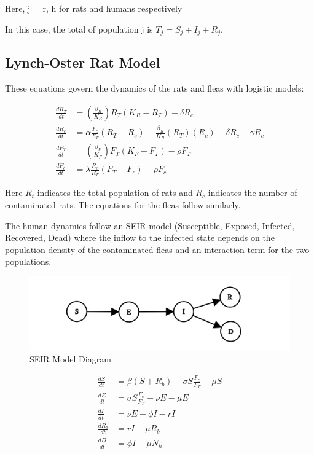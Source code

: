 \documentclass [letterpaper, 12pt] {article}
\begin{document}
Here, j = r, h for rats and humans respectively

In this case, the total of population j is $T_j = S_j + I_j + R_j$.

\newpage
\subsection{Lynch-Oster Rat Model}

These equations govern the dynamics of the rats and fleas with logistic models:

\begin{align}
	\frac{dR_T}{dt} & = (\frac{\beta_R}{K_R})R_T(K_R-R_T)-\delta R_c                                             \\
	\frac{dR_c}{dt} & = \alpha \frac{F_c}{F_T} (R_T-R_c)-\frac{\beta_R}{K_R}(R_T)(R_c) - \delta R_c - \gamma R_c \\
	\frac{dF_T}{dt} & = (\frac{\beta_F}{K_F})F_T(K_F-F_T)-\rho F_T                                               \\
	\frac{dF_c}{dt} & = \lambda \frac{R_c}{R_T} (F_T-F_c) - \rho F_c
\end{align}

Here $R_t$ indicates the total population of rats and $R_c$ indicates the number of contaminated rats. The equations for the fleas follow similarly.

The human dynamics follow an SEIR model (Susceptible, Exposed, Infected, Recovered, Dead) where the inflow to the infected state depends on the
population density of the contaminated fleas and an interaction term for the two populations.
\vspace{-0.2cm}
\begin{figure}[H]
	\centering
	\includegraphics[width=0.75\linewidth]{seird-graph}
	\vspace{-0.5cm}
	\caption{SEIR Model Diagram}
\end{figure}
\vspace{-0.5cm}

\begin{align}
	\frac{dS}{dt}   & = \beta (S+R_b) - \sigma S \frac{F_c}{F_T} - \mu S \\
	\frac{dE}{dt}   & = \sigma S \frac{F_c}{F_T} - \nu E - \mu E         \\
	\frac{dI}{dt}   & = \nu E - \phi I - rI                              \\
	\frac{dR_b}{dt} & = rI - \mu R_b                                     \\
	\frac{dD}{dt}   & = \phi I + \mu N_h
\end{align}
\end{document}
